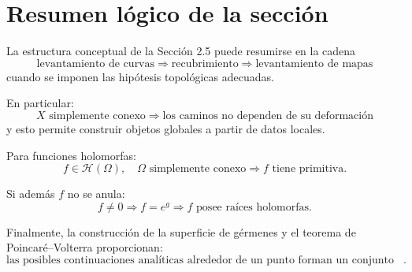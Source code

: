 \documentclass[11pt,a4paper]{article}
\theoremstyle{definition}
\theoremstyle{plain}
\theoremstyle{remark}
\newcommand{\Hol}{\mathcal H}
\begin{document}
\section{Resumen lógico de la sección}

La estructura conceptual de la Sección 2.5 puede resumirse en la cadena
\[
\boxed{
\text{levantamiento de curvas}
\Longrightarrow
\text{recubrimiento}
\Longrightarrow
\text{levantamiento de mapas}
}
\]
cuando se imponen las hipótesis topológicas adecuadas.

En particular:
\[
\boxed{
X\text{ simplemente conexo}
\Longrightarrow
\text{los caminos no dependen de su deformación}
}
\]
y esto permite construir objetos globales a partir de datos locales.

Para funciones holomorfas:
\[
\boxed{
f\in\Hol(\Omega),\quad
\Omega\text{ simplemente conexo}
\Longrightarrow
f\text{ tiene primitiva}.
}
\]

Si además $f$ no se anula:
\[
\boxed{
f\neq0
\Longrightarrow
f=e^g
\Longrightarrow
f\text{ posee raíces holomorfas}.
}
\]

Finalmente, la construcción de la superficie de gérmenes y el teorema
de Poincaré--Volterra proporcionan:
\[
\boxed{
\text{las posibles continuaciones analíticas alrededor de un punto
forman un conjunto numerable}.
}
\]
\end{document}
